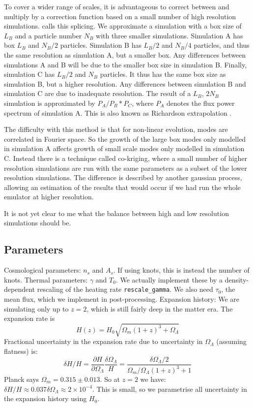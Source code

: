 \documentclass[10pt, aps, prd]{revtex4-1}
\begin{document}
To cover a wider range of scales, it is advantageous to correct between 
and multiply by a correction function based on a small number of high resolution simulations. \cite{McDonald:2004} calls this splicing. 
We approximate a simulation with a box size of $L_B$ and a particle number $N_B$ with three smaller simulations. Simulation A has 
box $L_B$ and $N_B/2$ particles. Simulation B has $L_B/2$ and $N_B/4$ particles, and thus the same resolution as simulation A, but a smaller box. 
Any differences between simulations A and B will be due to the smaller box size in simulation B. Finally, simulation C has $L_B/2$ and $N_B$ particles. 
It thus has the same box size as simulation B, but a higher resolution. Any differences between simulation B and simulation C are due to inadequate 
resolution. The result of a $L_B$, $2 N_B$ simulation is approximated by $P_A / P_B * P_C$, where $P_A$ denotes the flux power spectrum of simulation A.
This is also known as Richardson extrapolation \cite{Lukic:2013}.

The difficulty with this method is that for non-linear evolution, modes are correlated in Fourier space. So the growth of the large box modes only modelled 
in simulation A affects growth of small scale modes only modelled in simulation C. Instead there is a technique called co-kriging, where a small number 
of higher resolution simulations are run with the same parameters as a subset of the lower resolution simulations. The difference is described by 
another gaussian process, allowing an estimation of the results that would occur if we had run the whole emulator at higher resolution.

It is not yet clear to me what the balance between high and low resolution simulations should be.

\subsection{Parameters}
Cosmological parameters: $n_s$ and $A_s$. If using knots, this is instead the number of knots.
Thermal parameters: $\gamma$ and $T_0$. We actually implement these by a density-dependent rescaling of the heating rate \verb|rescale_gamma|.
We also need $\tau_0$, the mean flux, which we implement in post-processing.
Expansion history: We are simulating only up to $z=2$, which is still fairly deep in the matter era. The expansion rate is
\begin{equation}
 H(z) = H_0 \sqrt{\Omega_m (1+z)^3 + \Omega_\Lambda}
\end{equation}
Fractional uncertainty in the expansion rate due to uncertainty in $\Omega_\Lambda$ (assuming flatness) is:
\begin{equation}
 \delta H / H = \frac{\partial H}{\partial \Omega_\Lambda} \frac{\delta \Omega_\Lambda}{H} = \frac{\delta \Omega_\Lambda /2}{\Omega_m/\Omega_\Lambda (1+z)^3 + 1}
\end{equation}
Planck says $\Omega_m = 0.315 \pm 0.013$. So at $z=2$ we have: $\delta H /H \approx 0.037 \delta \Omega_\Lambda \approx 2\times 10^{-4}$. 
This is small, so we parametrise all uncertainty in the expansion history using $H_0$.
\end{document}
